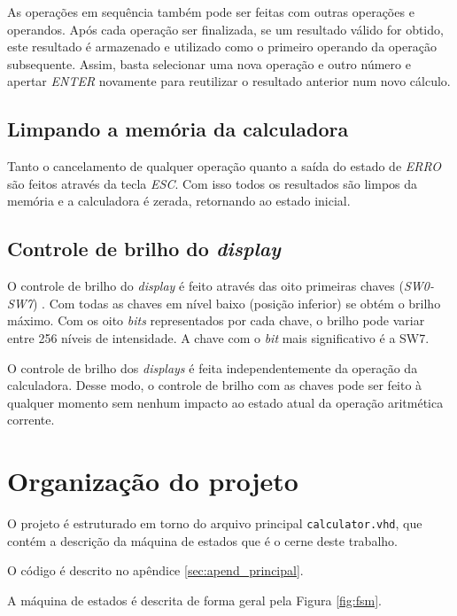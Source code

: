 \documentclass[a4paper,11pt]{article}
\begin{document}
As operações em sequência também pode ser feitas com outras operações e operandos. Após cada operação ser finalizada, se um resultado válido for obtido, este resultado é armazenado e utilizado como o primeiro operando da operação subsequente. Assim, basta selecionar uma nova operação e outro número e apertar \textit{ENTER} novamente para reutilizar o resultado anterior num novo cálculo.

\subsection{Limpando a memória da calculadora}

Tanto o cancelamento de qualquer operação quanto a saída do estado de \textit{ERRO} são feitos através da tecla \textit{ESC}. Com isso todos os resultados são limpos da memória e a calculadora é zerada, retornando ao estado inicial.

\subsection{Controle de brilho do \textit{display}}

O controle de brilho do \textit{display} é feito através das oito primeiras chaves (\textit{SW0-SW7}) . Com todas as chaves em nível baixo (posição inferior) se obtém o brilho máximo. Com os oito \textit{bits} representados por cada chave, o brilho pode variar entre 256 níveis de intensidade. A chave com o \textit{bit} mais significativo é a SW7.

O controle de brilho dos \textit{displays} é feita independentemente da operação da calculadora. Desse modo, o controle de brilho com as chaves pode ser feito à qualquer momento sem nenhum impacto ao estado atual da operação aritmética corrente.

\newpage
\section{Organização do projeto} \label{sec: org}

O projeto é estruturado em torno do arquivo principal \texttt{calculator.vhd}, que contém a descrição da máquina de estados que é o cerne deste trabalho. 

O código é descrito no apêndice \ref{sec:apend_principal}.

A máquina de estados é descrita de forma geral pela Figura \ref{fig:fsm}.
\end{document}
